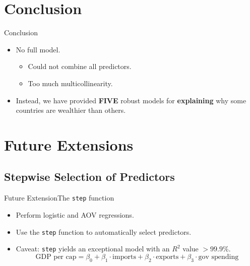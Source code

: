 \documentclass{beamer}
\begin{document}
\section{Conclusion}
\begin{frame}{Conclusion}
\begin{itemize}
\item No full model.
  \begin{itemize}
    \item Could not combine all predictors.
    \item Too much multicollinearity.
  \end{itemize}
\item Instead, we have provided {\bf FIVE} robust models for {\bf explaining} why some countries are wealthier than others.
\end{itemize}
\end{frame}


\section{Future Extensions}

\subsection{Stepwise Selection of Predictors}

\begin{frame}{Future Extension}{The {\tt step} function}
\begin{itemize}
\item Perform logistic and AOV regressions.
\item Use the {\tt step} function to automatically select predictors.
\item Caveat: {\tt step} yields an exceptional model with an $R^2$ value $> 99.9$\%.
$$\textrm{GDP per cap} = \beta_0 + \beta_1 \cdot \mathrm{imports} + \beta_2 \cdot \mathrm{exports} + \beta_3 \cdot \textrm{gov spending}$$
\end{itemize}
\end{frame}
\end{document}
